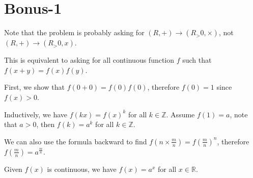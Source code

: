 \section*{Bonus-1}
Note that the problem is probably asking for $ (R,+) \to (R_>0,\times) $, not $ (R,+) \to (R_>0,x) $.

This is equivalent to asking for all continuous function $ f $ such that $ f(x+y) = f(x)f(y) $.

First, we show that $ f(0 + 0) = f(0)f(0) $, therefore $ f(0) = 1 $ since $ f(x) > 0 $.

Inductively, we have $ f(kx) = f(x)^k $ for all $ k \in \mathbb{Z} $. Assume $ f(1) = a $, note that $ a > 0 $, then $ f(k) = a^k $ for all $ k \in \mathbb{Z} $.

We can also use the formula backward to find $ f(n \times \frac{m}{n}) = f(\frac{m}{n})^n $, therefore $ f(\frac{m}{n}) = a^{\frac{m}{n}} $.

Given $ f(x) $ is continuous, we have $ f(x) = a^x $ for all $ x \in \mathbb{R} $. 